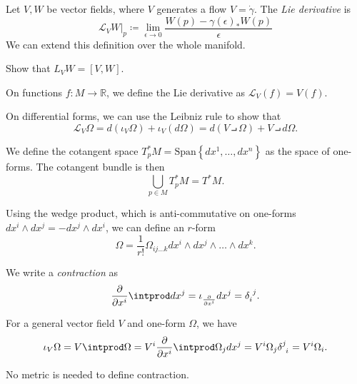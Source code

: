 
\begin{definition}
  Let $V, W$ be vector fields, where $V$ generates a flow $V = \dot{\gamma}$. The \emph{Lie derivative} is
  \begin{equation}
    \mathcal{L}_V W \rvert_p \coloneqq \lim_{\epsilon \to 0} \frac{W(p) - \gamma(\epsilon)_* W(p)}{\epsilon}
  \end{equation}
  We can extend this definition over the whole manifold.
\end{definition}
\begin{exercise}
  Show that $L_V W = [V, W]$.
\end{exercise}
\begin{definition}[]
  On functions $f \colon M \to \mathbb{R}$, we define the Lie derivative as $\mathcal{L}_V(f) = V(f)$.
\end{definition}
\begin{claim}
  On differential forms, we can use the Leibniz rule to show that
  \begin{equation}
    \mathcal{L}_V \Omega = d(\iota_V \Omega) + \iota_V (d\Omega) = d (V \intprod \Omega) + V \intprod d\Omega.
  \end{equation}
\end{claim}
\begin{definition}[]
  We define the cotangent space $T^*_p M = \text{Span}\left\{dx^1, \dots, dx^n\right\}$ as the space of one-forms.
  The cotangent bundle is then
  \begin{equation}
    \bigcup_{p\in M} T^*_p M = T^* M.
  \end{equation}
\end{definition}
\begin{definition}[$r$-form]
  Using the wedge product, which is anti-commutative on one-forms $dx^{i} \wedge dx^{j} = -dx^{j} \wedge dx^{i}$, we can define an $r$-form 
  \begin{equation}
    \Omega = \frac{1}{r!} \Omega_{ij \dots k} dx^{i} \wedge dx^{j} \wedge \dots \wedge dx^k.
  \end{equation}
\end{definition}
\begin{definition}[contraction]
  We write a \emph{contraction} as
  \begin{equation}
    \frac{\partial }{\partial x^{i}} \intprod dx^{j} = \iota_{\frac{\partial }{\partial x^{i}}} dx^{j} = \delta\indices{_{i}^{j}}.
  \end{equation}
\end{definition}
For a general vector field $V$ and one-form $ \Omega$, we have
\begin{equation}
\iota_V \Omega = V \intprod \Omega = V^{i} \frac{\partial }{\partial x^{i}} \intprod \Omega_j dx^{j} = V^{i} \Omega_{j} \delta\indices{^{j}_{i}} = V^{i} \Omega_{i}.
\end{equation}
\begin{remark}
  No metric is needed to define contraction.
\end{remark}

